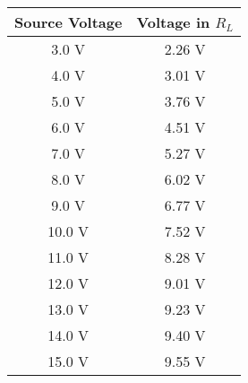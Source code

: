 \begin{tasks}
\begin{multicols}{2}
\begin{enumerate}
\begin{center}
\begin{tabular}[.5cm]{ c c }
\toprule
Source Voltage & Voltage in $R_{L}$ \\
\midrule
3.0 V & 2.26 V \\
\cmidrule{1-2}
4.0 V & 3.01 V \\
\cmidrule{1-2}
5.0 V & 3.76 V \\
\cmidrule{1-2}
6.0 V & 4.51 V \\
\cmidrule{1-2}
7.0 V & 5.27 V \\
\cmidrule{1-2}
8.0 V & 6.02 V \\
\cmidrule{1-2}
9.0 V & 6.77 V \\
\cmidrule{1-2}
10.0 V & 7.52 V \\
\cmidrule{1-2}
11.0 V & 8.28 V \\
\cmidrule{1-2}
12.0 V & 9.01 V \\
\cmidrule{1-2}
13.0 V & 9.23 V \\
\cmidrule{1-2}
14.0 V & 9.40 V \\
\cmidrule{1-2}
15.0 V & 9.55 V \\
\bottomrule
\end{tabular}
\end{center}
\end{enumerate}
\end{multicols}
\end{tasks}

\pagebreak